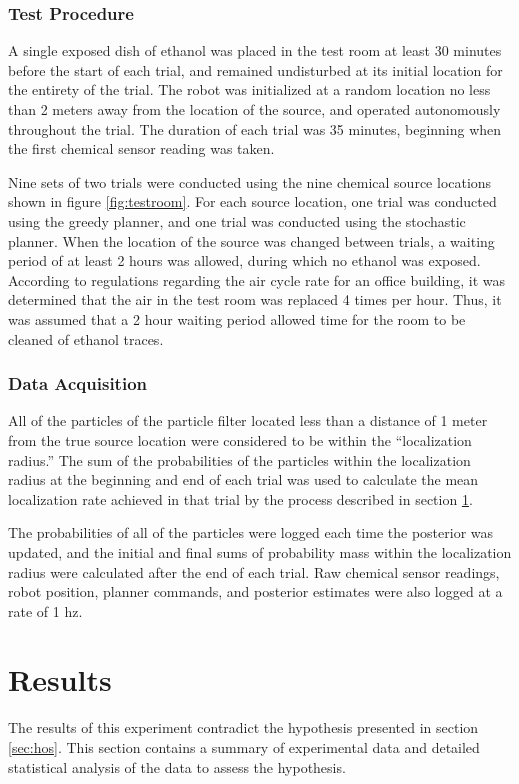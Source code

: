\documentclass[submit, 12pt]{aiaa-pretty-modified}
\begin{document}
\subsubsection{Test Procedure}
A single exposed dish of ethanol was placed in the test room at least 30
minutes before the start of each trial, and remained undisturbed at
its initial location for the entirety of the trial. The robot was
initialized at a random location no less than 2 meters away from the
location of the source, and operated  autonomously throughout
the trial.  The duration of each trial was 35 minutes, beginning when
the first chemical sensor reading was taken. 

Nine sets of two trials were conducted using the nine chemical source
locations shown in figure \ref{fig:testroom}.  For each source
location, one trial was conducted using the greedy planner, and one trial
was conducted using the stochastic planner.  When the location of the source was changed between trials, a waiting period of at least 2 hours
was allowed, during which no ethanol was exposed. According to regulations regarding the air
cycle rate for an office building, it was determined that the air in
the test room was replaced 4 times per hour.  Thus, it was assumed that a 2 hour waiting
period allowed time for the room to be cleaned of ethanol traces.

\subsubsection{Data Acquisition}
All of the particles of the particle filter located less than a distance of 1 meter from the
true source location were considered to be within the ``localization
radius.''  The sum of the probabilities of the particles within the
localization radius at the beginning and end of each trial was used to
calculate the mean localization rate achieved in that trial by the
process described in section \ref{sec:results}.

The probabilities of all of the particles were logged each time the
posterior was updated, and the initial and final sums of probability
mass within the localization radius were calculated after the
end of each trial. Raw chemical sensor readings, robot position, planner commands, and
posterior estimates were also logged at a rate of 1 hz.

\newpage

\section{Results}
\label{sec:results}
The results of this experiment contradict the hypothesis presented in
section \ref{sec:hos}.  This section contains  a summary of experimental data
and detailed statistical analysis of the data to assess the
hypothesis.
\end{document}
